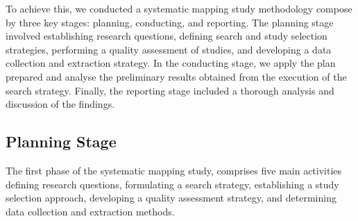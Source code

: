 To achieve this, we conducted a systematic mapping study methodology compose by three key stages: planning, conducting, and reporting. The planning stage involved establishing research questions, defining search and study selection strategies, performing a quality assessment of studies, and developing a data collection and extraction strategy. In the conducting stage, we apply the plan prepared and analyse the preliminary results obtained from the execution of the search strategy. Finally, the reporting stage included a thorough analysis and discussion of the findings.

\subsection{Planning Stage}
\label{sub:planning_stage}

The first phase of the systematic mapping study, comprises five main activities defining research questions, formulating a search strategy, establishing a study selection approach, developing a quality assessment strategy, and determining data collection and extraction methods.


